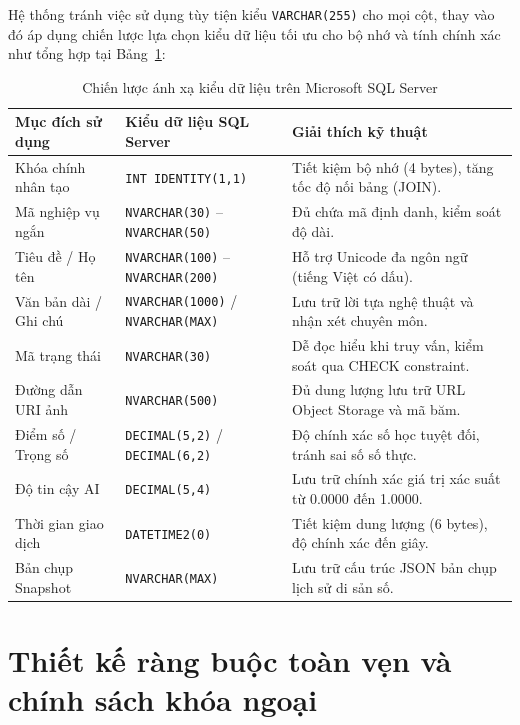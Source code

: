Hệ thống tránh việc sử dụng tùy tiện kiểu \texttt{VARCHAR(255)} cho mọi cột, thay vào đó áp dụng chiến lược lựa chọn kiểu dữ liệu tối ưu cho bộ nhớ và tính chính xác như tổng hợp tại Bảng~\ref{tab:c5_datatypes}:

\begin{table}[!ht]
\centering
\caption{Chiến lược ánh xạ kiểu dữ liệu trên Microsoft SQL Server}
\label{tab:c5_datatypes}
\small
\begin{tabularx}{\textwidth}{p{3.2cm}p{3.6cm}>{\raggedright\arraybackslash}X}
\toprule
\textbf{Mục đích sử dụng} & \textbf{Kiểu dữ liệu SQL Server} & \textbf{Giải thích kỹ thuật} \\
\midrule
Khóa chính nhân tạo & \texttt{INT IDENTITY(1,1)} & Tiết kiệm bộ nhớ (4 bytes), tăng tốc độ nối bảng (JOIN). \\
Mã nghiệp vụ ngắn & \texttt{NVARCHAR(30)} -- \texttt{NVARCHAR(50)} & Đủ chứa mã định danh, kiểm soát độ dài. \\
Tiêu đề / Họ tên & \texttt{NVARCHAR(100)} -- \texttt{NVARCHAR(200)} & Hỗ trợ Unicode đa ngôn ngữ (tiếng Việt có dấu). \\
Văn bản dài / Ghi chú & \texttt{NVARCHAR(1000)} / \texttt{NVARCHAR(MAX)} & Lưu trữ lời tựa nghệ thuật và nhận xét chuyên môn. \\
Mã trạng thái & \texttt{NVARCHAR(30)} & Dễ đọc hiểu khi truy vấn, kiểm soát qua CHECK constraint. \\
Đường dẫn URI ảnh & \texttt{NVARCHAR(500)} & Đủ dung lượng lưu trữ URL Object Storage và mã băm. \\
Điểm số / Trọng số & \texttt{DECIMAL(5,2)} / \texttt{DECIMAL(6,2)} & Độ chính xác số học tuyệt đối, tránh sai số số thực. \\
Độ tin cậy AI & \texttt{DECIMAL(5,4)} & Lưu trữ chính xác giá trị xác suất từ 0.0000 đến 1.0000. \\
Thời gian giao dịch & \texttt{DATETIME2(0)} & Tiết kiệm dung lượng (6 bytes), độ chính xác đến giây. \\
Bản chụp Snapshot & \texttt{NVARCHAR(MAX)} & Lưu trữ cấu trúc JSON bản chụp lịch sử di sản số. \\
\bottomrule
\end{tabularx}
\end{table}

\section{Thiết kế ràng buộc toàn vẹn và chính sách khóa ngoại}
\label{s:c5_constraints}

